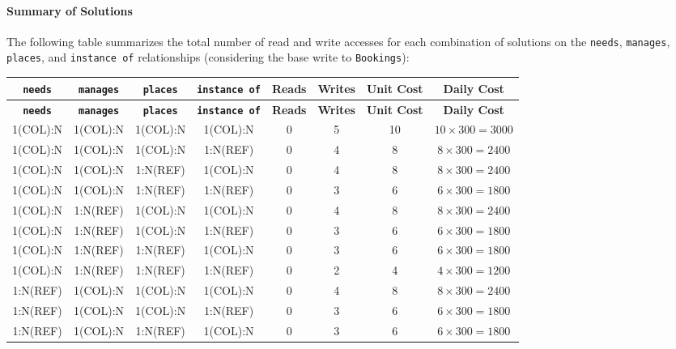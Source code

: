 \paragraph{Summary of Solutions}

The following table summarizes the total number of read and write accesses for each combination of solutions on the \texttt{needs}, \texttt{manages}, \texttt{places}, and \texttt{instance of} relationships (considering the base write to \texttt{Bookings}):

\begin{longtable}[H]{|c|c|c|c|c|c|c|c|}
    \hline
    \textbf{\texttt{needs}} & \textbf{\texttt{manages}} & \textbf{\texttt{places}} & \textbf{\texttt{instance of}} & \textbf{Reads} & \textbf{Writes} & \textbf{Unit Cost} & \textbf{Daily Cost} \\
    \hline
    \endfirsthead
    \hline
    \textbf{\texttt{needs}} & \textbf{\texttt{manages}} & \textbf{\texttt{places}} & \textbf{\texttt{instance of}} & \textbf{Reads} & \textbf{Writes} & \textbf{Unit Cost} & \textbf{Daily Cost} \\
    \hline
    \endhead
    1(COL):N & 1(COL):N & 1(COL):N & 1(COL):N & 0 & 5 & 10 & $10 \times 300 = 3000 $ \\
    \hline
    1(COL):N & 1(COL):N & 1(COL):N & 1:N(REF) & 0 & 4 & 8 & $8 \times 300 = 2400 $ \\
    \hline
    1(COL):N & 1(COL):N & 1:N(REF) & 1(COL):N & 0 & 4 & 8 & $8 \times 300 = 2400 $ \\
    \hline
    1(COL):N & 1(COL):N & 1:N(REF) & 1:N(REF) & 0 & 3 & 6 & $6 \times 300 = 1800 $ \\
    \hline
    1(COL):N & 1:N(REF) & 1(COL):N & 1(COL):N & 0 & 4 & 8 & $8 \times 300 = 2400 $ \\
    \hline
    1(COL):N & 1:N(REF) & 1(COL):N & 1:N(REF) & 0 & 3 & 6 & $6 \times 300 = 1800 $ \\
    \hline
    1(COL):N & 1:N(REF) & 1:N(REF) & 1(COL):N & 0 & 3 & 6 & $6 \times 300 = 1800 $ \\
    \hline
    1(COL):N & 1:N(REF) & 1:N(REF) & 1:N(REF) & 0 & 2 & 4 & $4 \times 300 = 1200 $ \\
    \hline
    1:N(REF) & 1(COL):N & 1(COL):N & 1(COL):N & 0 & 4 & 8 & $8 \times 300 = 2400 $ \\
    \hline
    1:N(REF) & 1(COL):N & 1(COL):N & 1:N(REF) & 0 & 3 & 6 & $6 \times 300 = 1800 $ \\
    \hline
    1:N(REF) & 1(COL):N & 1:N(REF) & 1(COL):N & 0 & 3 & 6 & $6 \times 300 = 1800 $ \\

\end{longtable}
